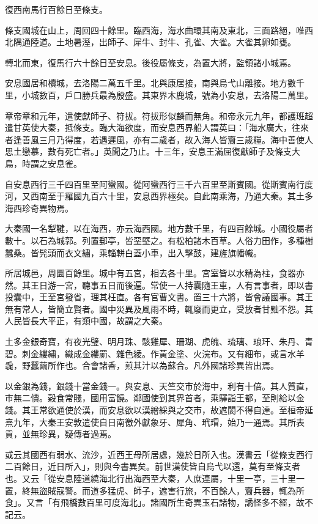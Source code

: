 \begin{pinyinscope}
復西南馬行百餘日至條支。

條支國城在山上，周回四十餘里。臨西海，海水曲環其南及東北，三面路絕，唯西北隅通陸道。土地暑溼，出師子、犀牛、封牛、孔雀、大雀。大雀其卵如甕。

轉北而東，復馬行六十餘日至安息。後役屬條支，為置大將，監領諸小城焉。

安息國居和櫝城，去洛陽二萬五千里。北與康居接，南與烏弋山離接。地方數千里，小城數百，戶口勝兵最為殷盛。其東界木鹿城，號為小安息，去洛陽二萬里。

章帝章和元年，遣使獻師子、符拔。符拔形似麟而無角。和帝永元九年，都護班超遣甘英使大秦，抵條支。臨大海欲度，而安息西界船人謂英曰：「海水廣大，往來者逢善風三月乃得度，若遇遲風，亦有二歲者，故入海人皆齎三歲糧。海中善使人思土戀慕，數有死亡者。」英聞之乃止。十三年，安息王滿屈復獻師子及條支大鳥，時謂之安息雀。

自安息西行三千四百里至阿蠻國。從阿蠻西行三千六百里至斯賓國。從斯賓南行度河，又西南至于羅國九百六十里，安息西界極矣。自此南乘海，乃通大秦。其土多海西珍奇異物焉。

大秦國一名犁鞬，以在海西，亦云海西國。地方數千里，有四百餘城。小國役屬者數十。以石為城郭。列置郵亭，皆堊塈之。有松柏諸木百草。人俗力田作，多種樹蠶桑。皆髡頭而衣文繡，乘輜軿白蓋小車，出入擊鼓，建旌旗幡幟。

所居城邑，周圜百餘里。城中有五宮，相去各十里。宮室皆以水精為柱，食器亦然。其王日游一宮，聽事五日而後遍。常使一人持囊隨王車，人有言事者，即以書投囊中，王至宮發省，理其枉直。各有官曹文書。置三十六將，皆會議國事。其王無有常人，皆簡立賢者。國中災異及風雨不時，輒廢而更立，受放者甘黜不怨。其人民皆長大平正，有類中國，故謂之大秦。

土多金銀奇寶，有夜光璧、明月珠、駭雞犀、珊瑚、虎魄、琉璃、琅玕、朱丹、青碧。刺金縷繡，織成金縷罽、雜色綾。作黃金塗、火浣布。又有細布，或言水羊毳，野蠶繭所作也。合會諸香，煎其汁以為蘇合。凡外國諸珍異皆出焉。

以金銀為錢，銀錢十當金錢一。與安息、天竺交巿於海中，利有十倍。其人質直，巿無二價。穀食常賤，國用富饒。鄰國使到其界首者，乘驛詣王都，至則給以金錢。其王常欲通使於漢，而安息欲以漢繒綵與之交市，故遮閡不得自達。至桓帝延熹九年，大秦王安敦遣使自日南徼外獻象牙、犀角、玳瑁，始乃一通焉。其所表貢，並無珍異，疑傳者過焉。

或云其國西有弱水、流沙，近西王母所居處，幾於日所入也。漢書云「從條支西行二百餘日，近日所入」，則與今書異矣。前世漢使皆自烏弋以還，莫有至條支者也。又云「從安息陸道繞海北行出海西至大秦，人庶連屬，十里一亭，三十里一置，終無盜賊寇警。而道多猛虎、師子，遮害行旅，不百餘人，齎兵器，輒為所食」。又言「有飛橋數百里可度海北」。諸國所生奇異玉石諸物，譎怪多不經，故不記云。


\end{pinyinscope}
